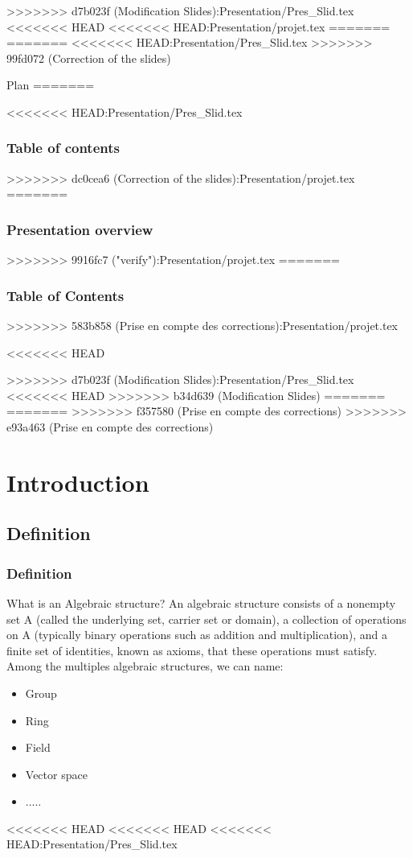 \documentclass{beamer}
\begin{document}
>>>>>>> d7b023f (Modification Slides):Presentation/Pres_Slid.tex
<<<<<<< HEAD
<<<<<<< HEAD:Presentation/projet.tex
=======
=======
<<<<<<< HEAD:Presentation/Pres_Slid.tex
>>>>>>> 99fd072 (Correction of the slides)
\begin{frame}{Plan}
\tableofcontents
=======
\begin{frame}
<<<<<<< HEAD:Presentation/Pres_Slid.tex
    \frametitle{Table of contents}
    \tableofcontents
>>>>>>> dc0cea6 (Correction of the slides):Presentation/projet.tex
=======
	\frametitle{Presentation overview } %
    \tableofcontents
>>>>>>> 9916fc7 ("verify"):Presentation/projet.tex
=======
    \frametitle{Table of Contents}
    \tableofcontents
    \end{frame}
>>>>>>> 583b858 (Prise en compte des corrections):Presentation/projet.tex
\end{frame}
<<<<<<< HEAD

>>>>>>> d7b023f (Modification Slides):Presentation/Pres_Slid.tex
<<<<<<< HEAD
>>>>>>> b34d639 (Modification Slides)
=======
=======
>>>>>>> f357580 (Prise en compte des corrections)
>>>>>>> e93a463 (Prise en compte des corrections)
\section{Introduction}


\subsection{Definition}
\begin{frame}
    \frametitle{Definition}
    What is an Algebraic structure? An algebraic structure consists of a nonempty set A (called the underlying set, carrier set or domain), a collection of operations on A (typically binary operations such as addition and multiplication), and a finite set of identities, known as axioms, that these operations must satisfy.
    Among the multiples algebraic structures, we can name:
    \begin{itemize}
        \item Group
        \item Ring
        \item Field
        \item Vector space
        \item .....
    \end{itemize}
\end{frame}
<<<<<<< HEAD
<<<<<<< HEAD
<<<<<<< HEAD:Presentation/Pres_Slid.tex
\end{document}
